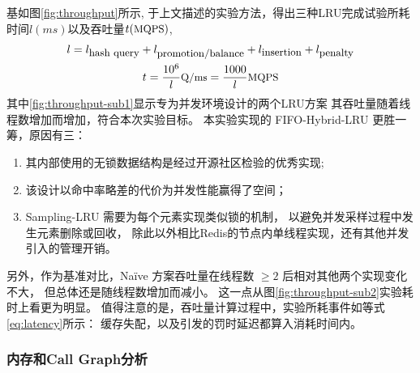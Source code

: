 基如图\ref{fig:throughput}所示, 于上文描述的实验方法，得出三种LRU完成试验所耗时间$l(ms)$以及吞吐量$t(\mbox{\small MQPS})$, 
\begin{gather}
    l = l_{\mbox{\small hash query}} + l_{\mbox{\small promotion/balance}} + l_{\mbox{\small insertion}} + l_{\mbox{\small penalty}} \label{eq:latency}\\
    t = \frac{10^6}{l} \mbox{\small Q/ms} = \frac{1000}{l} \mbox{\small MQPS}
\end{gather}
其中\ref{fig:throughput-sub1}显示专为并发环境设计的两个LRU方案
其吞吐量随着线程数增加而增加，符合本次实验目标。
本实验实现的 FIFO-Hybrid-LRU 更胜一筹，原因有三：
\begin{enumerate}
    \item 其内部使用的无锁数据结构是经过开源社区检验的优秀实现;
    \item 该设计以命中率略差的代价为并发性能赢得了空间；
    \item Sampling-LRU 需要为每个元素实现类似锁的机制，
        以避免并发采样过程中发生元素删除或回收，
        除此以外相比Redis的节点内单线程实现，还有其他并发引入的管理开销。
\end{enumerate}
另外，作为基准对比，Na\"{i}ve 方案吞吐量在线程数 $\geq 2$ 后相对其他两个实现变化不大，
但总体还是随线程数增加而减小。
这一点从图\ref{fig:throughput-sub2}实验耗时上看更为明显。
值得注意的是，吞吐量计算过程中，实验所耗事件如等式\ref{eq:latency}所示： 
缓存失配，以及引发的罚时延迟都算入消耗时间内。

\subsubsection{内存和Call Graph分析}


